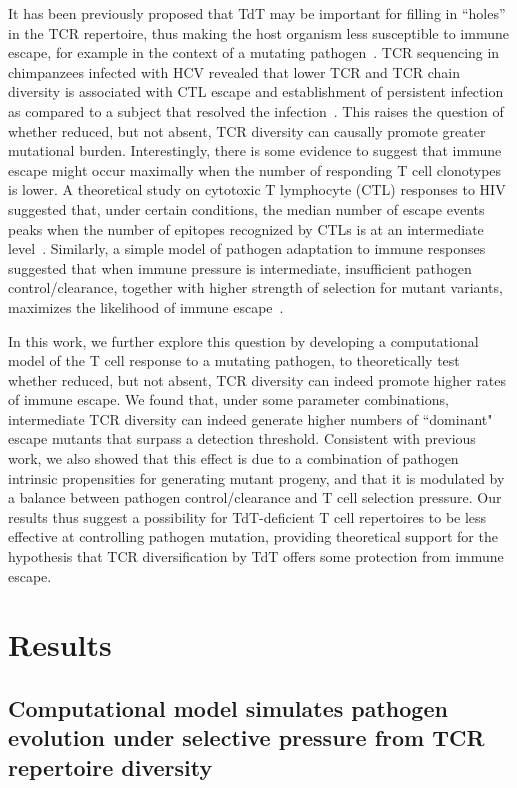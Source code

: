 It has been previously proposed that TdT may be important for filling in ``holes'' in the TCR repertoire, thus making the host organism less susceptible to immune escape, for example in the context of a mutating pathogen~\cite{vrisekoop2014revisiting}. TCR sequencing in chimpanzees infected with HCV revealed that lower TCR\textalpha{} and TCR\textbeta{} chain diversity is associated with CTL escape and establishment of persistent infection as compared to a subject that resolved the infection~\cite{meyer2004limited}. This raises the question of whether reduced, but not absent, TCR diversity can causally promote greater mutational burden. Interestingly, there is some evidence to suggest that immune escape might occur maximally when the number of responding T cell clonotypes is lower. A theoretical study on cytotoxic T lymphocyte (CTL) responses to HIV suggested that, under certain conditions, the median number of escape events peaks when the number of epitopes recognized by CTLs is at an intermediate level~\cite{van2013rate}. Similarly, a simple model of pathogen adaptation to immune responses suggested that when immune pressure is intermediate, insufficient pathogen control/clearance, together with higher strength of selection for mutant variants, maximizes the likelihood of immune escape~\cite{grenfell2004unifying}.

In this work, we further explore this question by developing a computational model of the T cell response to a mutating pathogen, to theoretically test whether reduced, but not absent, TCR diversity can indeed promote higher rates of immune escape. We found that, under some parameter combinations, intermediate TCR diversity can indeed generate higher numbers of ``dominant" escape mutants that surpass a detection threshold. Consistent with previous work, we also showed that this effect is due to a combination of pathogen intrinsic propensities for generating mutant progeny, and that it is modulated by a balance between pathogen control/clearance and T cell selection pressure. Our results thus suggest a possibility for TdT-deficient T cell repertoires to be less effective at controlling pathogen mutation, providing theoretical support for the hypothesis that TCR diversification by TdT offers some protection from immune escape.

\section{Results}

\subsection{Computational model simulates pathogen evolution under selective pressure from TCR repertoire diversity}

